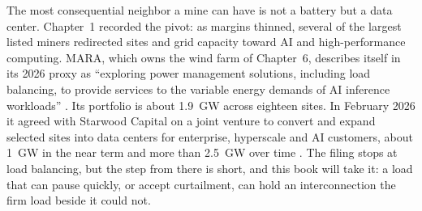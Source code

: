 The most consequential neighbor a mine can have is not a battery but a data center. Chapter~1 recorded the pivot: as margins thinned, several of the largest listed miners redirected sites and grid capacity toward AI and high-performance computing. %
MARA, which owns the wind farm of Chapter~6, describes itself in its 2026 proxy as ``exploring power management solutions, including load balancing, to provide services to the variable energy demands of AI inference workloads'' \autocite{mara2026def14a}. Its portfolio is about 1.9~GW across eighteen sites. In February 2026 it agreed with Starwood Capital on a joint venture to convert and expand selected sites into data centers for enterprise, hyperscale and AI customers, about 1~GW in the near term and more than 2.5~GW over time \autocite{mara2026starwood}. %
The filing stops at load balancing, but the step from there is short, and this book will take it: a load that can pause quickly, or accept curtailment, can hold an interconnection the firm load beside it could not. %

